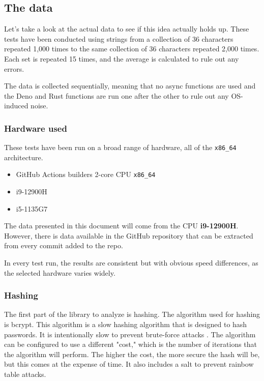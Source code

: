\documentclass[12pt, letterpaper]{article}
\begin{document}
\begin{multicols}{2}
    \subsection{The data}

    Let's take a look at the actual data to see if this idea actually holds up. These tests have been conducted using strings from a collection of 36 characters repeated 1,000 times to the same collection of 36 characters repeated 2,000 times. Each set is repeated 15 times, and the average is calculated to rule out any errors.

    The data is collected sequentially, meaning that no async functions are used and the Deno and Rust functions are run one after the other to rule out any OS-induced noise.

    \subsubsection{Hardware used}

    These tests have been run on a broad range of hardware, all of the \verb|x86_64| architecture.

    \begin{itemize}
        \item GitHub Actions builders 2-core CPU \verb|x86_64| \cite{Github}
        \item i9-12900H
        \item i5-1135G7
    \end{itemize}

    The data presented in this document will come from the CPU \textbf{i9-12900H}. However, there is data available in the GitHub repository that can be extracted from every commit added to the repo.

    In every test run, the results are consistent but with obvious speed differences, as the selected hardware varies widely.

    \subsubsection{Hashing}

    The first part of the library to analyze is hashing. The algorithm used for hashing is bcrypt. This algorithm is a slow hashing algorithm that is designed to hash passwords. It is intentionally slow to prevent brute-force attacks \cite{Bcrypt}. The algorithm can be configured to use a different "cost," which is the number of iterations that the algorithm will perform. The higher the cost, the more secure the hash will be, but this comes at the expense of time. It also includes a salt to prevent rainbow table attacks.


\end{multicols}
\end{document}
